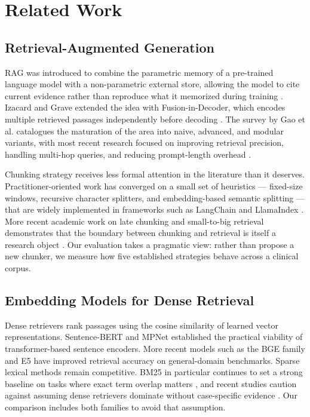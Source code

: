 \documentclass[12pt]{article}
\begin{document}
\section{Related Work}

\subsection{Retrieval-Augmented Generation}

RAG was introduced to combine the parametric memory of a pre-trained language model with a non-parametric external store, allowing the model to cite current evidence rather than reproduce what it memorized during training \cite{lewis2020rag}. Izacard and Grave extended the idea with Fusion-in-Decoder, which encodes multiple retrieved passages independently before decoding \cite{izacard2021fid}. The survey by Gao et al. catalogues the maturation of the area into naive, advanced, and modular variants, with most recent research focused on improving retrieval precision, handling multi-hop queries, and reducing prompt-length overhead \cite{gao2023ragsurvey}.

Chunking strategy receives less formal attention in the literature than it deserves. Practitioner-oriented work has converged on a small set of heuristics --- fixed-size windows, recursive character splitters, and embedding-based semantic splitting --- that are widely implemented in frameworks such as LangChain and LlamaIndex \cite{langchain2023,kamradt2023}. More recent academic work on late chunking and small-to-big retrieval demonstrates that the boundary between chunking and retrieval is itself a research object \cite{gunther2024late}. Our evaluation takes a pragmatic view: rather than propose a new chunker, we measure how five established strategies behave across a clinical corpus.

\subsection{Embedding Models for Dense Retrieval}

Dense retrievers rank passages using the cosine similarity of learned vector representations. Sentence-BERT \cite{reimers2019sbert} and MPNet \cite{song2020mpnet} established the practical viability of transformer-based sentence encoders. More recent models such as the BGE family \cite{xiao2023bge,chen2024bgem3} and E5 \cite{wang2022e5} have improved retrieval accuracy on general-domain benchmarks. Sparse lexical methods remain competitive. BM25 in particular continues to set a strong baseline on tasks where exact term overlap matters \cite{robertson2009bm25}, and recent studies caution against assuming dense retrievers dominate without case-specific evidence \cite{thakur2021beir}. Our comparison includes both families to avoid that assumption.
\end{document}
